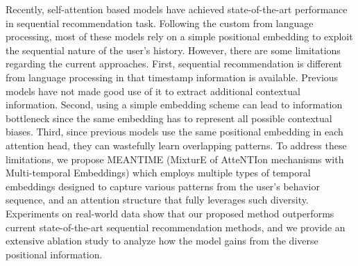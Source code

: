 Recently, self-attention based models have achieved state-of-the-art performance in sequential recommendation task. Following the custom from language processing, most of these models rely on a simple positional embedding to exploit the sequential nature of the user's history. However, there are some limitations regarding the current approaches. First, sequential recommendation is different from language processing in that timestamp information is available. Previous models have not made good use of it to extract additional contextual information. Second, using a simple embedding scheme can lead to information bottleneck since the same embedding has to represent all possible contextual biases. Third, since previous models use the same positional embedding in each attention head, they can wastefully learn overlapping patterns. To address these limitations, we propose MEANTIME (MixturE of AtteNTIon mechanisms with Multi-temporal Embeddings) which employs multiple types of temporal embeddings designed to capture various patterns from the user's behavior sequence, and an attention structure that fully leverages such diversity. Experiments on real-world data show that our proposed method outperforms current state-of-the-art sequential recommendation methods, and we provide an extensive ablation study to analyze how the model gains from the diverse positional information.